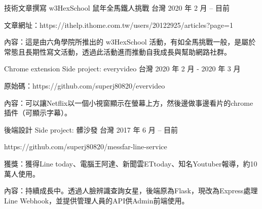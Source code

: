 

\begin{cventries}

  \cventry
    {技術文章撰寫} %
    {w3HexSchool 鼠年全馬鐵人挑戰} %
    {台灣} %
    {2020 年 2 月 – 目前} %
    {
      \begin{cvitems} %
        \item {文章網址：https://ithelp.ithome.com.tw/users/20122925/articles?page=1}
        \item {內容：這是由六角學院所推出的 w3HexSchool 活動，有如全馬挑戰一般，是屬於常態且長期性寫文活動，透過此活動進而推動自我成長與幫助網路社群。}
      \end{cvitems}
    }
  \cventry
    {Chrome extension} %
    {Side project: everyvideo} %
    {台灣} %
    {2020 年 2 月 - 2020 年 3 月} %
    {
      \begin{cvitems} %
        \item {原始碼：https://github.com/superj80820/evervideo}
        \item {內容：可以讓Netflix以一個小視窗顯示在螢幕上方，然後邊做事邊看片的chrome插件（可顯示字幕）。}
      \end{cvitems}
    }
  \cventry
    {後端設計} %
    {Side project: 髒沙發} %
    {台灣} %
    {2017 年 6 月 – 目前} %
    {
      \begin{cvitems} %
        \item {https://github.com/superj80820/messfar-line-service}
        \item {獲獎：獲得Line today、電腦王阿達、新聞雲ETtoday、知名Youtuber報導，約10萬人使用。}
        \item {內容：持續成長中。透過人臉辨識查詢女星，後端原為Flask，現改為Express處理Line Webhook，並提供管理人員的API供Admin前端使用。}

\end{cvitems}}
\end{cventries}
